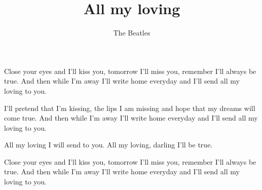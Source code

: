 \beginsong

\title{All my loving}
\author{The Beatles}

\beginverse
Close your eyes and I'll kiss you, tomorrow I'll miss you,
remember I'll always be true. 
And then while I'm away I'll write home everyday
and I'll send all my loving to you.
\endverse

\beginverse
I'll pretend that I'm kissing, the lips I am missing
and hope that my dreams will come true. 
And then while I'm away I'll write home everyday
and I'll send all my loving to you.
\endverse

\beginrefrain
All my loving I will send to you.
All my loving, darling I'll be true.
\endrefrain

\beginverse
Close your eyes and I'll kiss you, tomorrow I'll miss you,
remember I'll always be true. 
And then while I'm away I'll write home everyday
and I'll send all my loving to you.
\endverse

